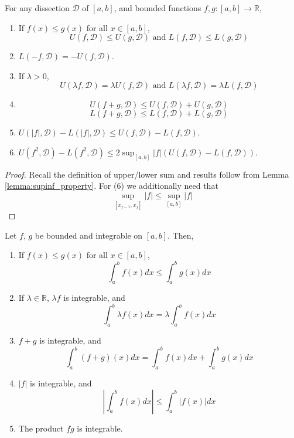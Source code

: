 \documentclass[10pt, a4paper, twoside]{report}
\begin{document}
\begin{corollary}
    For any dissection \(\mathcal{D}\) of \([a,b]\), and bounded functions \(f,g:[a,b]\to\mathbb{R}\),
    \begin{enumerate}
        \item If \(f(x)\leq g(x)\) for all \(x\in[a,b]\), 
        \[U(f,\mathcal{D})\leq U(g,\mathcal{D})\text{  and  }L(f,\mathcal{D})\leq L(g,\mathcal{D})\]
        \item \(L(-f,\mathcal{D})=-U(f,\mathcal{D})\).
        \item If \(\lambda>0\),
        \[U(\lambda f,\mathcal{D})=\lambda U(f,\mathcal{D})\text{  and  }L(\lambda f,\mathcal{D})=\lambda L(f,\mathcal{D})\]
        \item \[U(f+g,\mathcal{D})\leq U(f,\mathcal{D})+U(g,\mathcal{D})\]
        \[L(f+g,\mathcal{D})\leq L(f,\mathcal{D})+L(g,\mathcal{D})\]
        \item \(U(|f|,\mathcal{D})-L(|f|,\mathcal{D})\leq U(f,\mathcal{D})-L(f,\mathcal{D})\).
        \item \(U(f^2,\mathcal{D})-L(f^2,\mathcal{D})\leq 2\sup_{[a,b]}|f|(U(f,\mathcal{D})-L(f,\mathcal{D}))\).
    \end{enumerate}
    \label{coro:uplowsum_property}
\end{corollary}
\begin{proof}
    Recall the definition of upper/lower sum and results follow from Lemma \ref{lemma:supinf_property}. For (6) we additionally need that 
    \[\sup_{[x_{j-1},x_j]}|f|\leq\sup_{[a,b]}|f|\]
\end{proof}
\begin{theorem}
    Let \(f\), \(g\) be bounded and integrable on \([a,b]\). Then,
    \begin{enumerate}
        \item If \(f(x)\leq g(x)\) for all \(x\in[a,b]\),
        \[\int_a^bf(x)dx\leq\int_a^bg(x)dx\]
        \item If \(\lambda\in\mathbb{R}\), \(\lambda f\) is integrable, and 
        \[\int_a^b\lambda f(x)dx=\lambda\int_a^bf(x)dx\]
        \item \(f+g\) is integrable, and 
        \[\int_a^b(f+g)(x)dx=\int_a^bf(x)dx+\int_a^bg(x)dx\]
        \item \(|f|\) is integrable, and 
        \[\left|\int_a^bf(x)dx\right|\leq\int_a^b|f(x)|dx\]
        \item The product \(fg\) is integrable.
    \end{enumerate}
    \label{thm:integral_property}
\end{theorem}
\end{document}
